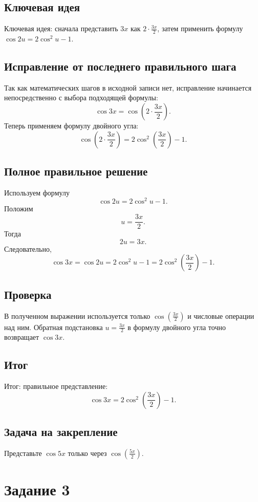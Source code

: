 \documentclass[12pt,a4paper]{article}
\newcommand{\keyidea}[1]{\textcolor{blue!60!black}{Ключевая идея:} #1}
\newcommand{\resultlabel}[1]{\textcolor{teal!60!black}{Итог:} #1}
\begin{document}
\subsection*{Ключевая идея}
\keyidea{сначала представить $3x$ как $2\cdot\frac{3x}{2}$, затем применить формулу $\cos 2u=2\cos^2u-1$.}

\subsection*{Исправление от последнего правильного шага}
Так как математических шагов в исходной записи нет, исправление начинается непосредственно с выбора подходящей формулы:
\[
\cos 3x
=\cos\left(2\cdot\frac{3x}{2}\right).
\]
Теперь применяем формулу двойного угла:
\[
\cos\left(2\cdot\frac{3x}{2}\right)
=2\cos^2\!\left(\frac{3x}{2}\right)-1.
\]

\subsection*{Полное правильное решение}
Используем формулу
\[
\cos 2u=2\cos^2u-1.
\]
Положим
\[
u=\frac{3x}{2}.
\]
Тогда
\[
2u=3x.
\]
Следовательно,
\[
\cos 3x
=\cos 2u
=2\cos^2u-1
=2\cos^2\!\left(\frac{3x}{2}\right)-1.
\]

\subsection*{Проверка}
В полученном выражении используется только $\cos\!\left(\frac{3x}{2}\right)$ и числовые операции над ним. Обратная подстановка $u=\frac{3x}{2}$ в формулу двойного угла точно возвращает $\cos 3x$.

\subsection*{Итог}
\resultlabel{правильное представление:}
\[
\boxed{\cos 3x=2\cos^2\!\left(\frac{3x}{2}\right)-1}.
\]

\subsection*{Задача на закрепление}
Представьте $\cos 5x$ только через $\cos\!\left(\frac{5x}{2}\right)$.

\newpage
{}\label{task:3}
\section*{Задание 3}
\end{document}
